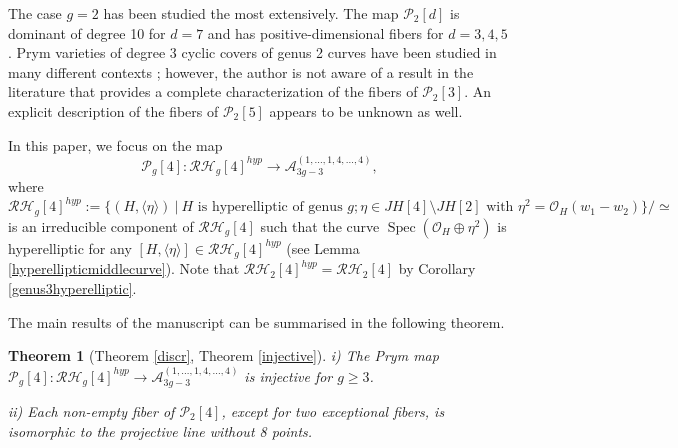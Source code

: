 \documentclass{article}
\newtheorem{thm}{Theorem}[section]
\numberwithin{equation}{section}
\DeclareMathOperator{\Spec}{Spec}
\begin{document}
The case $g=2$ has been studied the most extensively. The map $\mathcal{P}_2[d]$ is dominant of degree 10 for $d=7$ \cite{MR3519095} and has positive-dimensional fibers for $d=3,4,5$ \cite{MR3522345, borowka2025prymsmathbbz3timesmathbbz3coveringsgenus}. Prym varieties of degree 3 cyclic covers of genus 2 curves have been studied in many different contexts \cite{BLiso, BLEE, ries}; however, the author is not aware of a result in the literature that provides a complete characterization of the fibers of $\mathcal{P}_2[3]$. An explicit description of the fibers of $\mathcal{P}_2[5]$ appears to be unknown as well.  

In this paper, we focus on the map $$\mathcal{P}_g[4]: \mathcal{RH}_g[4]^{hyp} \to \mathcal{A}_{3g-3}^{(1,\ldots,1,4,\ldots, 4)},$$ where $$\mathcal{RH}_g[4]^{hyp} := \{(H, \langle\eta\rangle) \: | \: H \text{ is hyperelliptic of genus } g; \eta \in JH[4]\setminus JH[2] \text{ with } \eta^2 = \mathcal{O}_H(w_1 - w_2)\}/\simeq$$ is an irreducible component of $\mathcal{RH}_g[4]$ such that the curve $\Spec(\mathcal{O}_H \oplus \eta^2)$ is hyperelliptic for any $[H, \langle \eta \rangle] \in \mathcal{RH}_g[4]^{hyp}$ (see Lemma \ref{hyperellipticmiddlecurve}). Note that $\mathcal{RH}_2[4]^{hyp} = \mathcal{RH}_2[4]$ by Corollary \ref{genus3hyperelliptic}.

The main results of the manuscript can be summarised in the following theorem.


\begin{thm}[Theorem \ref{discr}, Theorem \ref{injective}]

i) The Prym map $\mathcal{P}_g[4]: \mathcal{RH}_g[4]^{hyp} \to\mathcal{A}_{3g-3}^{(1,\ldots,1,4,\ldots, 4)} $ is injective for $g \geq 3$.

ii) Each non-empty fiber of $\mathcal{P}_2[4]$, except for two exceptional fibers, is isomorphic to the projective line without 8 points.

    
\end{thm}
\end{document}
